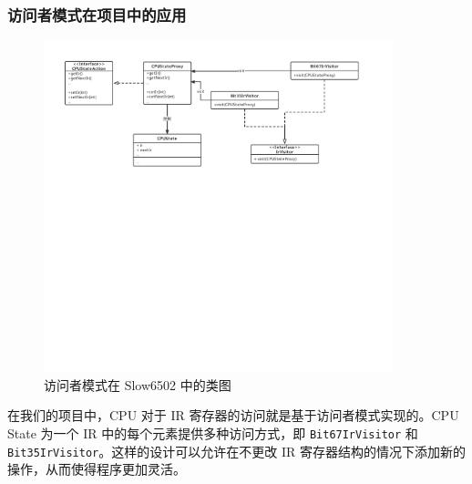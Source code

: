 \subsubsection{访问者模式在项目中的应用}

\begin{figure}[H]
  \centering
  \includegraphics[width=0.9\textwidth]{figures/Visitor.pdf}
  \caption{访问者模式在 Slow6502 中的类图}
\end{figure}

在我们的项目中，CPU 对于 IR 寄存器的访问就是基于访问者模式实现的。CPU State 为一个 IR 中的每个元素提供多种访问方式，即 \lstinline{Bit67IrVisitor} 和 \lstinline{Bit35IrVisitor}。这样的设计可以允许在不更改 IR 寄存器结构的情况下添加新的操作，从而使得程序更加灵活。

